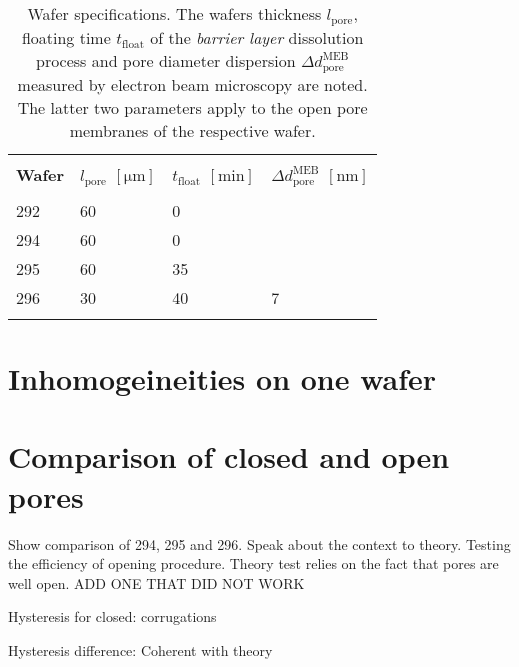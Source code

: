 \documentclass[../thesis.tex]{subfiles}
\begin{document}
        \begin{table}[htb]
          \caption{Wafer specifications. The wafers thickness $l_\mathrm{pore}$, floating time $t_\mathrm{float}$ of the \textit{barrier layer} dissolution process and pore diameter dispersion $\Delta d_\mathrm{pore}^\mathrm{MEB}$ measured by electron beam microscopy are noted. The latter two parameters apply to the open pore membranes of the respective wafer.}
          \label{tbl:wafer-specifications}
          \begin{tabu} {X[r]X[r]X[r]X[r]}
            \unitoprule \\
            \textbf{Wafer} & \textbf{$l_\mathrm{pore}$ $[\si{\micro\meter}]$} & \textbf{$t_\mathrm{float}$ $[\si{\minute}]$} & \textbf{$\Delta d_\mathrm{pore}^\mathrm{MEB}$ $[\si{\nano\meter}]$} \\
            \unimidrule \\
            292 &60  &0   & \\
            294 &60  &0   &  \\
            295 &60  &35  &  \\
            296 &30  &40  &7   \\
            \unitoprule \\
          \end{tabu}
        \end{table}





      \section{Inhomogeineities on one wafer}
      \label{sec:wafer-inhomogeneities}


      \section{Comparison of closed and open pores}
      \label{sec:comparison-cp-op}

        Show comparison of 294, 295 and 296. Speak about the context to theory. Testing the efficiency of opening procedure. Theory test relies on the fact that pores are well open. ADD ONE THAT DID NOT WORK

        Hysteresis for closed: corrugations

        Hysteresis difference: Coherent with theory
\end{document}

